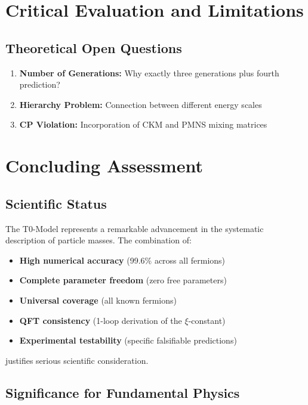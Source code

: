 	\section{Critical Evaluation and Limitations}
	\label{sec:critical_evaluation}
	
	\subsection{Theoretical Open Questions}
	\label{subsec:open_questions}
	
	\begin{enumerate}
		\item \textbf{Number of Generations:} Why exactly three generations plus fourth prediction?
		\item \textbf{Hierarchy Problem:} Connection between different energy scales
		\item \textbf{CP Violation:} Incorporation of CKM and PMNS mixing matrices
	\end{enumerate}
	
	\section{Concluding Assessment}
	\label{sec:concluding_assessment}
	
	\subsection{Scientific Status}
	\label{subsec:scientific_status}
	
	The T0-Model represents a remarkable advancement in the systematic description of particle masses. The combination of:
	
	\begin{itemize}
		\item \textbf{High numerical accuracy} (99.6\% across all fermions)
		\item \textbf{Complete parameter freedom} (zero free parameters)
		\item \textbf{Universal coverage} (all known fermions)
		\item \textbf{QFT consistency} (1-loop derivation of the $\xi$-constant)
		\item \textbf{Experimental testability} (specific falsifiable predictions)
	\end{itemize}
	
	justifies serious scientific consideration.
	
	\subsection{Significance for Fundamental Physics}
	\label{subsec:significance_physics}
	
